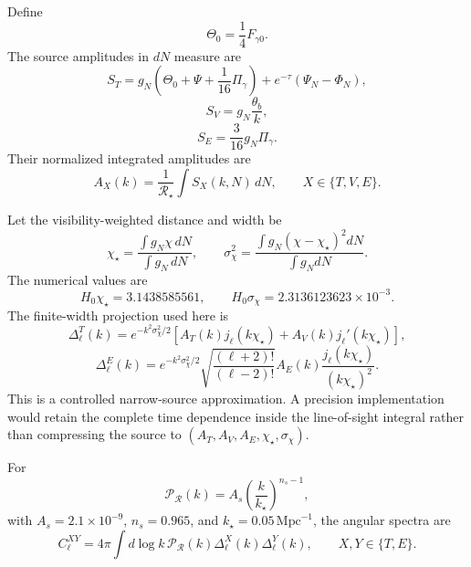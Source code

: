 Define
\begin{equation}
 \Theta_0=\frac14F_{\gamma0}.
 \label{eq:pcmb-temperature-monopole}
\end{equation}
The source amplitudes in $dN$ measure are
\begin{equation}
 S_T
 =g_N\left(\Theta_0+\Psi+\frac1{16}\Pi_\gamma\right)
 +e^{-\tau}(\Psi_N-\Phi_N),
 \label{eq:pcmb-temperature-source}
\end{equation}
\begin{equation}
 S_V=g_N\frac{\theta_b}{k},
 \label{eq:pcmb-velocity-source}
\end{equation}
\begin{equation}
 S_E=\frac{3}{16}g_N\Pi_\gamma.
 \label{eq:pcmb-polarization-source}
\end{equation}
Their normalized integrated amplitudes are
\begin{equation}
 A_X(k)=\frac{1}{\mathcal R_\star}\int S_X(k,N)\,dN,
 \qquad
 X\in\{T,V,E\}.
 \label{eq:pcmb-integrated-sources}
\end{equation}

Let the visibility-weighted distance and width be
\begin{equation}
 \chi_\star
 =\frac{\int g_N\chi\,dN}{\int g_N\,dN},
 \qquad
 \sigma_\chi^2
 =\frac{\int g_N(\chi-\chi_\star)^2dN}{\int g_NdN}.
 \label{eq:pcmb-source-distance-width}
\end{equation}
The numerical values are
\begin{equation}
 \boxed{
 H_0\chi_\star=3.1438585561,
 \qquad
 H_0\sigma_\chi=2.3136123623\times10^{-3}.}
 \label{eq:pcmb-distance-width-values}
\end{equation}
The finite-width projection used here is
\begin{equation}
 \Delta_\ell^T(k)
 =e^{-k^2\sigma_\chi^2/2}
 \left[A_T(k)j_\ell(k\chi_\star)
 +A_V(k)j_\ell'(k\chi_\star)\right],
 \label{eq:pcmb-temperature-transfer}
\end{equation}
\begin{equation}
 \Delta_\ell^E(k)
 =e^{-k^2\sigma_\chi^2/2}
 \sqrt{\frac{(\ell+2)!}{(\ell-2)!}}
 A_E(k)\frac{j_\ell(k\chi_\star)}{(k\chi_\star)^2}.
 \label{eq:pcmb-e-transfer}
\end{equation}
This is a controlled narrow-source approximation.  A precision implementation would retain the complete time dependence inside the line-of-sight integral rather than compressing the source to $(A_T,A_V,A_E,\chi_\star,\sigma_\chi)$.

For
\begin{equation}
 \mathcal P_{\mathcal R}(k)
 =A_s\left(\frac{k}{k_\star}\right)^{n_s-1},
 \label{eq:pcmb-primordial-spectrum}
\end{equation}
with $A_s=2.1\times10^{-9}$, $n_s=0.965$, and $k_\star=0.05\,\mathrm{Mpc}^{-1}$, the angular spectra are
\begin{equation}
 C_\ell^{XY}
 =4\pi\int d\log k\,
 \mathcal P_{\mathcal R}(k)
 \Delta_\ell^X(k)\Delta_\ell^Y(k),
 \qquad
 X,Y\in\{T,E\}.
 \label{eq:pcmb-angular-spectra}
\end{equation}

